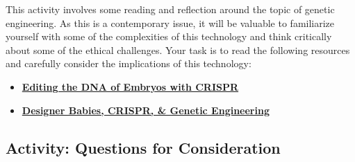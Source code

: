\documentclass[
]{book}
\providecommand{\tightlist}{%
  \setlength{\itemsep}{0pt}\setlength{\parskip}{0pt}}
\begin{document}
\begin{reflect}
This activity involves some reading and reflection around the topic of genetic engineering. As this is a contemporary issue, it will be valuable to familiarize yourself with some of the complexities of this technology and think critically about some of the ethical challenges. Your task is to read the following resources and carefully consider the implications of this technology:

\begin{itemize}
\tightlist
\item
  \href{https://www.statnews.com/2019/09/16/could-editing-the-dna-of-embryos-with-crispr-help-save-people-who-are-already-alive/}{\textbf{Editing the DNA of Embryos with CRISPR}}
\item
  \href{https://www.geneticsandsociety.org/internal-content/designer-babies-crispr-genetic-engineering}{\textbf{Designer Babies, CRISPR, \& Genetic Engineering}}
\end{itemize}
\end{reflect}

\hypertarget{activity-questions-for-consideration-2}{%
\subsection*{Activity: Questions for Consideration}\label{activity-questions-for-consideration-2}}
\end{document}
